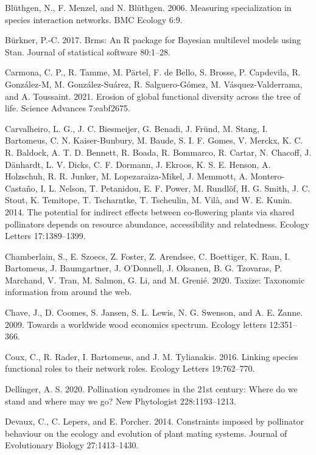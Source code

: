 \documentclass[12pt,a4paper,]{article}
\begin{document}
\hypertarget{ref-bluthgen2006}{}
Blüthgen, N., F. Menzel, and N. Blüthgen. 2006. Measuring specialization
in species interaction networks. BMC Ecology 6:9.

\hypertarget{ref-burkner2017}{}
Bürkner, P.-C. 2017. Brms: An R package for Bayesian multilevel models
using Stan. Journal of statistical software 80:1--28.

\hypertarget{ref-carmona2021}{}
Carmona, C. P., R. Tamme, M. Pärtel, F. de Bello, S. Brosse, P.
Capdevila, R. González-M, M. González-Suárez, R. Salguero-Gómez, M.
Vásquez-Valderrama, and A. Toussaint. 2021. Erosion of global functional
diversity across the tree of life. Science Advances 7:eabf2675.

\hypertarget{ref-carvalheiro2014}{}
Carvalheiro, L. G., J. C. Biesmeijer, G. Benadi, J. Fründ, M. Stang, I.
Bartomeus, C. N. Kaiser-Bunbury, M. Baude, S. I. F. Gomes, V. Merckx, K.
C. R. Baldock, A. T. D. Bennett, R. Boada, R. Bommarco, R. Cartar, N.
Chacoff, J. Dänhardt, L. V. Dicks, C. F. Dormann, J. Ekroos, K. S. E.
Henson, A. Holzschuh, R. R. Junker, M. Lopezaraiza-Mikel, J. Memmott, A.
Montero-Castaño, I. L. Nelson, T. Petanidou, E. F. Power, M. Rundlöf, H.
G. Smith, J. C. Stout, K. Temitope, T. Tscharntke, T. Tscheulin, M.
Vilà, and W. E. Kunin. 2014. The potential for indirect effects between
co-flowering plants via shared pollinators depends on resource
abundance, accessibility and relatedness. Ecology Letters 17:1389--1399.

\hypertarget{ref-chamberlain2020}{}
Chamberlain, S., E. Szoecs, Z. Foster, Z. Arendsee, C. Boettiger, K.
Ram, I. Bartomeus, J. Baumgartner, J. O'Donnell, J. Oksanen, B. G.
Tzovaras, P. Marchand, V. Tran, M. Salmon, G. Li, and M. Grenié. 2020.
Taxize: Taxonomic information from around the web.

\hypertarget{ref-chave2009}{}
Chave, J., D. Coomes, S. Jansen, S. L. Lewis, N. G. Swenson, and A. E.
Zanne. 2009. Towards a worldwide wood economics spectrum. Ecology
letters 12:351--366.

\hypertarget{ref-coux2016}{}
Coux, C., R. Rader, I. Bartomeus, and J. M. Tylianakis. 2016. Linking
species functional roles to their network roles. Ecology Letters
19:762--770.

\hypertarget{ref-dellinger2020}{}
Dellinger, A. S. 2020. Pollination syndromes in the 21st century: Where
do we stand and where may we go? New Phytologist 228:1193--1213.

\hypertarget{ref-devaux2014}{}
Devaux, C., C. Lepers, and E. Porcher. 2014. Constraints imposed by
pollinator behaviour on the ecology and evolution of plant mating
systems. Journal of Evolutionary Biology 27:1413--1430.
\end{document}
